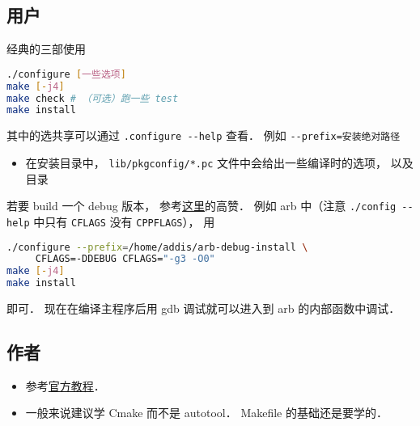 
\begin{issues}
\issueDraft
\end{issues}



\subsection{用户}
经典的三部使用
\begin{lstlisting}[language=bash]
./configure [一些选项]
make [-j4]
make check # （可选）跑一些 test
make install
\end{lstlisting}
其中的选共享可以通过 \verb|.configure --help| 查看． 例如 \verb|--prefix=安装绝对路径|

\begin{itemize}
\item 在安装目录中， \verb|lib/pkgconfig/*.pc| 文件中会给出一些编译时的选项， 以及目录
\end{itemize}


若要 build 一个 debug 版本， 参考\href{https://stackoverflow.com/questions/4553735/gnu-autotools-debug-release-targets}{这里}的高赞． 例如 arb 中（注意 \verb|./config --help| 中只有 \verb|CFLAGS| 没有 \verb|CPPFLAGS|）， 用
\begin{lstlisting}[language=bash]
./configure --prefix=/home/addis/arb-debug-install \
     CFLAGS=-DDEBUG CFLAGS="-g3 -O0"
make [-j4]
make install
\end{lstlisting}
即可． 现在在编译主程序后用 gdb 调试就可以进入到 arb 的内部函数中调试．

\subsection{作者}
\begin{itemize}
\item 参考\href{https://www.gnu.org/software/automake/manual/html_node/Autotools-Introduction.html}{官方教程}．
\item 一般来说建议学 Cmake\upref{CMakeN} 而不是 autotool． Makefile 的基础还是要学的．
\end{itemize}
